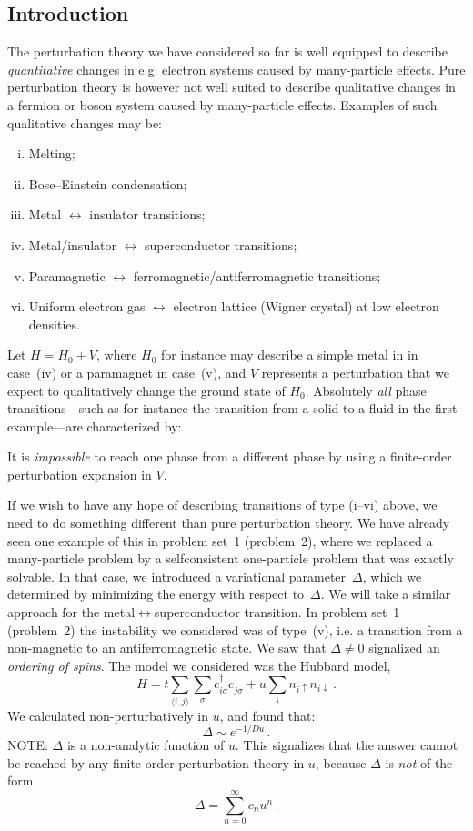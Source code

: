\subsection{Introduction}
The perturbation theory we have considered so far is well equipped to describe \emph{quantitative} changes in e.g. electron systems caused by many-particle effects.
Pure perturbation theory is however not well suited to describe qualitative changes in a fermion or boson system caused by many-particle effects.
Examples of such qualitative changes may be:
\begin{enumerate}[(i)]
  \item Melting;
  \item Bose--Einstein condensation;
  \item Metal $\leftrightarrow$ insulator transitions;
  \item Metal/insulator  $\leftrightarrow$ superconductor transitions;
  \item Paramagnetic $\leftrightarrow$ ferromagnetic/antiferromagnetic transitions;
  \item Uniform electron gas $\leftrightarrow$ electron lattice (Wigner crystal) at low electron densities.
\end{enumerate}
Let $H = H_0 + V$, where $H_0$ for instance may describe a simple metal in in case~(iv) or a paramagnet in case~(v), and $V$ represents a perturbation that we expect to qualitatively change the ground state of $H_0$.
Absolutely \emph{all} phase transitions---such as for instance the transition from a solid to a fluid in the first example---are characterized by:

\begin{Indent}
  It is \emph{impossible} to reach one phase from a different phase by using a finite-order perturbation expansion in $V$.
\end{Indent}
If we wish to have any hope of describing transitions of type (i--vi) above, we need to do something different than pure perturbation theory.
We have already seen one example of this in problem set~1 (problem~2), where we replaced a many-particle problem by a selfconsistent one-particle problem that was exactly solvable.
In that case, we introduced a variational parameter~$\Delta$, which we determined by minimizing the energy with respect to~$\Delta$.
We will take a similar approach for the metal$\leftrightarrow$superconductor transition.
In problem set~1 (problem~2) the instability we considered was of type~(v), i.e. a transition from a non-magnetic to an antiferromagnetic state.
We saw that $\Delta\neq0$ signalized an \emph{ordering of spins}.
The model we considered was the Hubbard model,
\[
  H = t \sum_{\langle i,j \rangle} \sum_\sigma c^\dagger_{i\sigma} c^{\phantom{\dagger}}_{j\sigma} + u\sum_i n_{i\uparrow} n_{i\downarrow} \,.
\]
We calculated non-perturbatively in $u$, and found that:
\[
  \Delta \sim e^{-1/Du} \,.
\]
NOTE: $\Delta$ is a non-analytic function of $u$.
This signalizes that the answer cannot be reached by any finite-order perturbation theory in $u$, because $\Delta$ is \emph{not} of the form
\[
  \Delta = \sum_{n=0}^\infty c_n u^n\,.
\]



